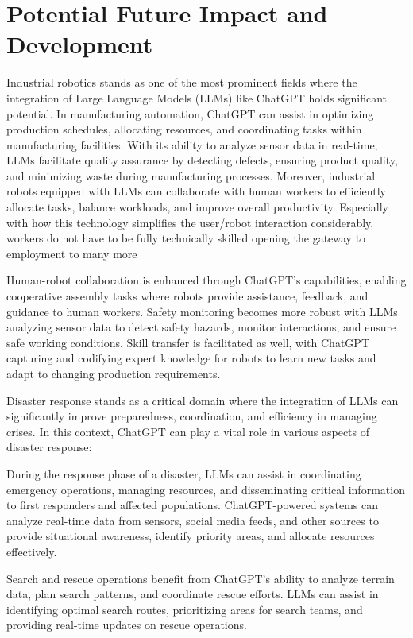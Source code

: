 \documentclass[journal]{IEEEtran}
\begin{document}
\section{Potential Future Impact and Development}

Industrial robotics stands as one of the most prominent fields where the integration of Large Language Models (LLMs) like ChatGPT holds significant potential. In manufacturing automation, ChatGPT can assist in optimizing production schedules, allocating resources, and coordinating tasks within manufacturing facilities. With its ability to analyze sensor data in real-time, LLMs facilitate quality assurance by detecting defects, ensuring product quality, and minimizing waste during manufacturing processes. Moreover, industrial robots equipped with LLMs can collaborate with human workers to efficiently allocate tasks, balance workloads, and improve overall productivity. Especially with how this technology simplifies the user/robot interaction considerably, workers do not have to be fully technically skilled opening the gateway to employment to many more

Human-robot collaboration is enhanced through ChatGPT's capabilities, enabling cooperative assembly tasks where robots provide assistance, feedback, and guidance to human workers. Safety monitoring becomes more robust with LLMs analyzing sensor data to detect safety hazards, monitor interactions, and ensure safe working conditions. Skill transfer is facilitated as well, with ChatGPT capturing and codifying expert knowledge for robots to learn new tasks and adapt to changing production requirements.

Disaster response stands as a critical domain where the integration of LLMs can significantly improve preparedness, coordination, and efficiency in managing crises. In this context, ChatGPT can play a vital role in various aspects of disaster response:

During the response phase of a disaster, LLMs can assist in coordinating emergency operations, managing resources, and disseminating critical information to first responders and affected populations. ChatGPT-powered systems can analyze real-time data from sensors, social media feeds, and other sources to provide situational awareness, identify priority areas, and allocate resources effectively.

Search and rescue operations benefit from ChatGPT's ability to analyze terrain data, plan search patterns, and coordinate rescue efforts. LLMs can assist in identifying optimal search routes, prioritizing areas for search teams, and providing real-time updates on rescue operations.
\end{document}
